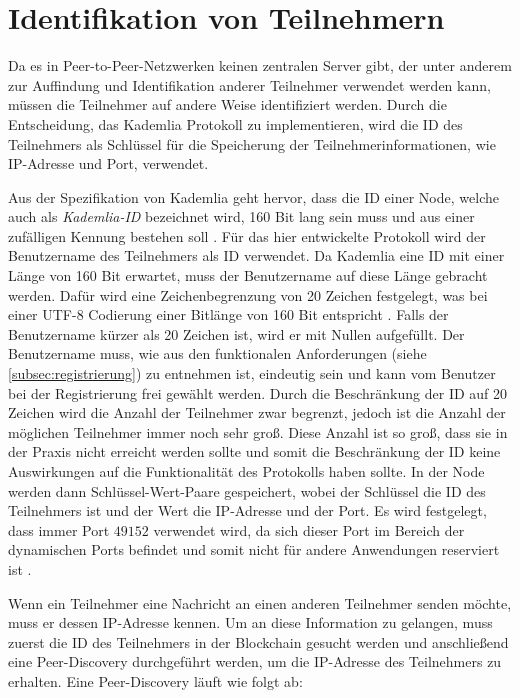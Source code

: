 \section{Identifikation von Teilnehmern}
\label{subsec:identifikation_von_teilnehmern}

Da es in Peer-to-Peer-Netzwerken keinen zentralen Server gibt, der unter anderem zur Auffindung und Identifikation anderer Teilnehmer verwendet werden kann, müssen die Teilnehmer auf andere Weise identifiziert werden. Durch die Entscheidung, das Kademlia Protokoll zu implementieren, wird die ID des Teilnehmers als Schlüssel für die Speicherung der Teilnehmerinformationen, wie IP-Adresse und Port, verwendet.

Aus der Spezifikation von Kademlia geht hervor, dass die ID einer Node, welche auch als \textit{Kademlia-ID} bezeichnet wird, 160 Bit lang sein muss und aus einer zufälligen Kennung bestehen soll \parencite[S. 2]{Maymounkov_Kademlia}. Für das hier entwickelte Protokoll wird der Benutzername des Teilnehmers als ID verwendet. Da Kademlia eine ID mit einer Länge von 160 Bit erwartet, muss der Benutzername auf diese Länge gebracht werden. Dafür wird eine Zeichenbegrenzung von 20 Zeichen festgelegt, was bei einer UTF-8 Codierung einer Bitlänge von 160 Bit entspricht \parencite{rfc3629_utf-8}. Falls der Benutzername kürzer als 20 Zeichen ist, wird er mit Nullen aufgefüllt.
Der Benutzername muss, wie aus den funktionalen Anforderungen (siehe \ref{subsec:registrierung}) zu entnehmen ist, eindeutig sein und kann vom Benutzer bei der Registrierung frei gewählt werden. 
Durch die Beschränkung der ID auf 20 Zeichen wird die Anzahl der Teilnehmer zwar begrenzt, jedoch ist die Anzahl der möglichen Teilnehmer immer noch sehr groß. Diese Anzahl ist so groß, dass sie in der Praxis nicht erreicht werden sollte und somit die Beschränkung der ID keine Auswirkungen auf die Funktionalität des Protokolls haben sollte.
In der Node werden dann Schlüssel-Wert-Paare gespeichert, wobei der Schlüssel die ID des Teilnehmers ist und der Wert die IP-Adresse und der Port. Es wird festgelegt, dass immer Port $49152$ verwendet wird, da sich dieser Port im Bereich der dynamischen Ports befindet und somit nicht für andere Anwendungen reserviert ist \parencite[S. 20]{rfc6335_IANA_Ports}. 

Wenn ein Teilnehmer eine Nachricht an einen anderen Teilnehmer senden möchte, muss er dessen IP-Adresse kennen. Um an diese Information zu gelangen, muss zuerst die ID des Teilnehmers in der Blockchain gesucht werden und anschließend eine Peer-Discovery durchgeführt werden, um die IP-Adresse des Teilnehmers zu erhalten. Eine Peer-Discovery läuft wie folgt ab:

